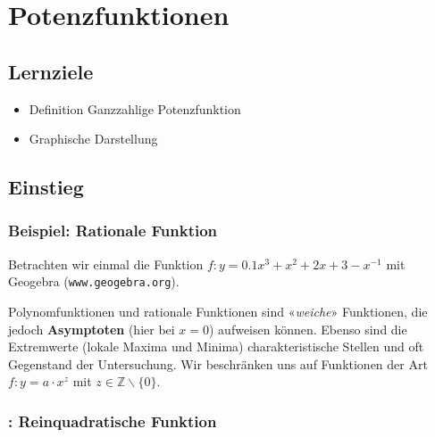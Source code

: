 \section{Potenzfunktionen}

\subsection*{Lernziele}

\begin{itemize}
\item Definition Ganzzahlige Potenzfunktion
\item Graphische Darstellung
\end{itemize}
\newpage


\subsection{Einstieg}

\subsubsection{Beispiel: Rationale Funktion}

Betrachten wir einmal die Funktion $f: y = 0.1x^3 + x^2 + 2x + 3 - x^{-1}$ \zB mit Geogebra (\texttt{www.geogebra.org}).



Polynomfunktionen und rationale Funktionen sind «\textit{weiche}» Funktionen, die jedoch \textbf{Asymptoten} (hier bei $x=0$) aufweisen können.
Ebenso sind die Extremwerte (lokale Maxima und Minima) charakteristische Stellen und oft Gegenstand der Untersuchung.
Wir beschränken uns auf Funktionen der Art $f: y=a\cdot{}x^z$
mit $z \in \mathbb{Z}\backslash\{0\}$.

\newpage
\subsubsection{: Reinquadratische Funktion}

